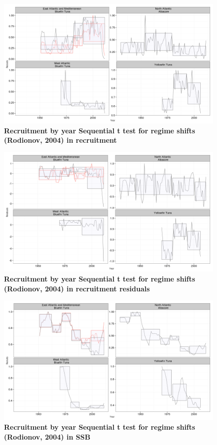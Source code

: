 \documentclass[a4paper, 10pt]{article}
\begin{document}
\begin{figure}[!ht]\begin{center} 
\includegraphics{figs/sr-stars-rec2.png}
\end{center}
\caption{\bf{Recruitment by year Sequential t test for regime shifts (Rodionov, 2004) in recruitment}}
\label{stars}\end{figure} 

\begin{figure}[!ht]\begin{center} 
\includegraphics{figs/sr-stars-rsdl2.png}
\end{center}
\caption{\bf{Recruitment by year Sequential t test for regime shifts (Rodionov, 2004) in recruitment residuals}}
\label{stars2}\end{figure} 

\begin{figure}[!ht]\begin{center} 
\includegraphics{figs/sr-stars-ssb2.png}
\end{center}
\caption{\bf{Recruitment by year Sequential t test for regime shifts (Rodionov, 2004) in SSB}}
\label{stars3}\end{figure} 
\end{document}
